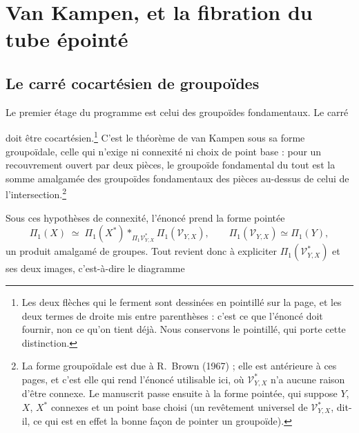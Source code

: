 \documentclass[11pt,a4paper]{article}
\begin{document}
\section*{Van Kampen, et la fibration du tube épointé}

\subsection*{Le carré cocartésien de groupoïdes}

Le premier étage du programme est celui des groupoïdes fondamentaux. Le carré


doit être cocartésien.\footnote{Les deux flèches qui le ferment sont dessinées
en pointillé sur la page, et les deux termes de droite mis entre parenthèses :
c'est ce que l'énoncé doit fournir, non ce qu'on tient déjà. Nous conservons le
pointillé, qui porte cette distinction.} C'est le théorème de van Kampen sous sa
forme groupoïdale, celle qui n'exige ni connexité ni choix de point base : pour
un recouvrement ouvert par deux pièces, le groupoïde fondamental du tout est la
somme amalgamée des groupoïdes fondamentaux des pièces au-dessus de celui de
l'intersection.\footnote{La forme groupoïdale est due à R.~Brown (1967) ; elle
est antérieure à ces pages, et c'est elle qui rend l'énoncé
utilisable ici, où $\mathcal{V}^{*}_{Y,X}$ n'a aucune raison d'être connexe. Le
manuscrit passe ensuite à la forme pointée, qui suppose $Y$, $X$, $X^{*}$
connexes et un point base choisi (un revêtement universel de
$\mathcal{V}^{*}_{Y,X}$, dit-il, ce qui est en effet la bonne façon de pointer
un groupoïde).}

Sous ces hypothèses de connexité, l'énoncé prend la forme pointée
\[
  \Pi_{1}(X) \;\simeq\;
  \Pi_{1}(X^{*}) \ast_{\Pi_{1}\mathcal{V}^{*}_{Y,X}} \Pi_{1}(\mathcal{V}_{Y,X}),
  \qquad \Pi_{1}(\mathcal{V}_{Y,X}) \simeq \Pi_{1}(Y),
\]
un produit amalgamé de groupes. Tout revient donc à expliciter
$\Pi_{1}(\mathcal{V}^{*}_{Y,X})$ et ses deux images, c'est-à-dire le diagramme

\end{document}
